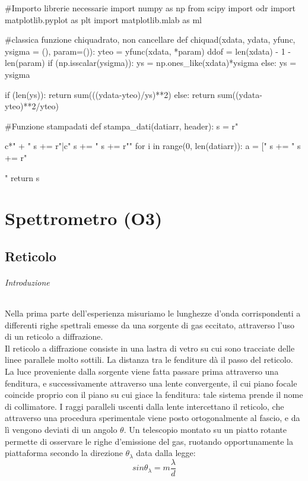 \begin{sagesilent}
#Importo librerie necessarie
import numpy as np
from scipy import odr
import matplotlib.pyplot as plt
import matplotlib.mlab as ml

#classica funzione chiquadrato, non cancellare
def chiquad(xdata, ydata, yfunc, ysigma = (), param=()):
    yteo = yfunc(xdata, *param)
    ddof = len(xdata) - 1 - len(param)
    if (np.isscalar(ysigma)):
        ys = np.ones_like(xdata)*ysigma
    else:
        ys = ysigma
 
    if (len(ys)):
        return sum(((ydata-yteo)/ys)**2)
    else:
        return sum((ydata-yteo)**2/yteo)

        
#Funzione stampadati
def stampa_dati(datiarr, header):
  s = r"\begin{tabular}{c*{" + "%
  s += r"}{|c}}"
  s += "%
  s += r"\midrule"
  for i in range(0, len(datiarr)):
    a = ["%
    s += "%
  s += r"\end{tabular}"
  return s
        
\end{sagesilent}



\chapter{ Spettrometro (O3)}


\section*{Reticolo}

\subparagraph{Introduzione}

Nella prima parte dell'esperienza misuriamo le lunghezze d'onda corrispondenti a differenti righe spettrali emesse da una sorgente di gas eccitato, attraverso l'uso di un reticolo a diffrazione. \\
Il reticolo a diffrazione consiste in una lastra di vetro su cui sono tracciate delle linee parallele molto sottili. La distanza tra le fenditure dà il passo del reticolo.\\
La luce proveniente dalla sorgente viene fatta passare prima attraverso una fenditura, e successivamente attraverso una lente convergente, il cui piano focale coincide proprio con il piano su cui giace la fenditura: tale sistema prende il nome di collimatore. I raggi paralleli uscenti dalla lente intercettano il reticolo, che attraverso una procedura sperimentale viene posto ortogonalmente al fascio, e da lì vengono deviati di un angolo $\theta$. Un telescopio montato su un piatto rotante permette di osservare le righe d'emissione del gas, ruotando opportunamente la piattaforma secondo la direzione $\theta_{\lambda} $ data dalla legge:
\begin{equation}
sin \theta_{\lambda} = m \frac{\lambda}{d}
\label{eq:theta}
\end{equation}


